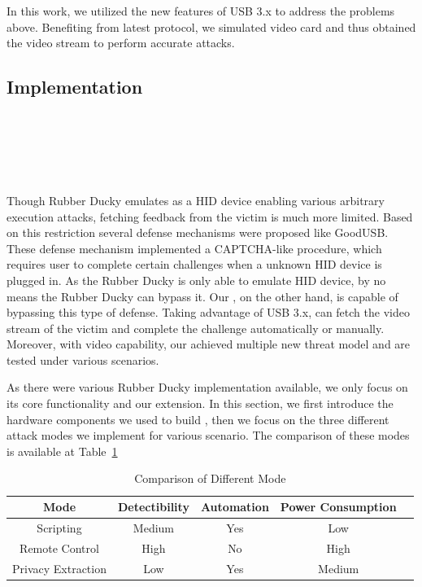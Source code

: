 In this work, we utilized the new features of USB 3.x \cite{usb31} \cite{usb32} to address the problems above.
Benefiting from latest protocol, we simulated video card and thus obtained the video stream to perform accurate attacks.

\subsection{Implementation}
\noindent{}\\
\\
\\
\\
\\
Though Rubber Ducky\cite{rubber} emulates as a HID device enabling various arbitrary execution attacks, fetching feedback from the victim is much more limited. Based on this restriction several defense mechanisms were proposed  like GoodUSB\cite{tian2015defending}. These defense mechanism implemented a CAPTCHA-like\cite{captcha} procedure, which requires user to complete certain challenges when a unknown HID device is plugged in. As the Rubber Ducky is only able to emulate HID device, by no means the Rubber Ducky can bypass it. Our \tool, on the other hand, is capable of bypassing this type of defense. Taking advantage of USB 3.x\cite{usb31}\cite{usb32}, \tool can fetch the video stream of the victim and complete the challenge automatically or manually. Moreover, with video capability, our \tool achieved multiple new threat model and are tested under various scenarios.

As there were various Rubber Ducky implementation available, we only focus on its core functionality and our extension. In this section, we first introduce the hardware components we used to build \tool, then we focus on the three different attack modes we implement  for various scenario. The comparison of these modes is available at Table~\ref{table:mode_comparison}
\begin{table}
	\centering
	\begin{tabular}{|c|c|c|c|c|}
	\hline
	Mode & Detectibility & Automation & Power Consumption  \\
	\hline
	Scripting & Medium & Yes & Low\\
	\hline
	Remote Control & High & No & High \\
	\hline
	Privacy Extraction & Low & Yes & Medium\\
	\hline
	\end{tabular}
	\linebreak
	\caption{Comparison of Different Mode}
	\label{table:mode_comparison}
\end{table}

